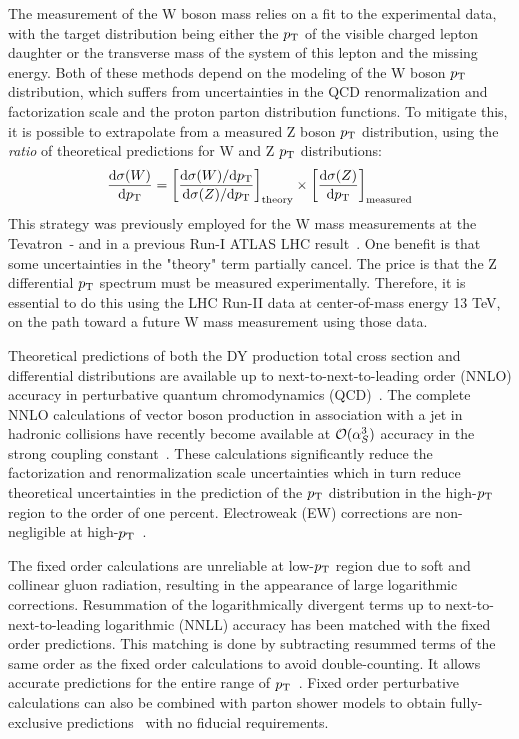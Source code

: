 The measurement of the W boson mass relies on a fit to the experimental data, with the
target distribution being either the $p_{\mathrm{T}}$ of the visible charged lepton daughter
or the transverse mass of the system of this lepton and the missing energy.
Both of these methods depend on the modeling of the W boson $p_{\mathrm{T}}$ distribution,
which suffers from uncertainties in the QCD renormalization and factorization scale and the proton parton distribution functions.
To mitigate this, it is possible to extrapolate from a measured Z boson $p_{\mathrm{T}}$ distribution, using
the \textit{ratio} of theoretical predictions for W and Z $p_{\mathrm{T}}$ distributions:
\begin{equation}
\frac{\mathrm{d}\sigma(W)}{\mathrm{d} p_{\mathrm{T}}} = \left[ \frac{\mathrm{d}\sigma(W)/\mathrm{d}p_{\mathrm{T}} }{\mathrm{d}\sigma(Z)/\mathrm{d} p_{\mathrm{T}} } \right]_\mathrm{theory} \times \left[ \frac{\mathrm{d}\sigma(Z)}{\mathrm{d} p_{\mathrm{T}}} \right]_\mathrm{measured}
\end{equation}
This strategy was previously employed for the W mass measurements at the Tevatron~\cite{Abazov:2012bv}-\cite{Aaltonen:2012bp} and in a previous Run-I ATLAS LHC result~\cite{Aaboud:2017svj}.
One benefit is that some uncertainties in the "theory" term partially cancel.
The price is that the Z differential $p_{\mathrm{T}}$ spectrum must be measured experimentally.
Therefore, it is essential to do this using the LHC Run-II data at center-of-mass energy 13 TeV,
on the path toward a future W mass measurement using those data.
      
Theoretical predictions of both the DY production total cross section and 
differential distributions are available up to next-to-next-to-leading order 
(NNLO) accuracy in perturbative quantum chromodynamics 
(QCD)~\cite{Melnikov:2006kv,Catani:2009sm}. The complete NNLO calculations of 
vector boson production in association with a jet in hadronic collisions have 
recently become available at $\mathcal{O}(\alpha_S^3)$ accuracy in the strong 
coupling constant~\cite{Ridder:2015dxa,Boughezal:2015ded,Boughezal:2015dva}. 
These calculations significantly reduce the factorization and renormalization scale 
uncertainties which in turn reduce theoretical uncertainties in the prediction 
of the $p_{\mathrm{T}}$ distribution in the high-$p_{\mathrm{T}}$ region to the order of one 
percent. Electroweak (EW) corrections are non-negligible at 
high-$p_{\mathrm{T}}$~\cite{Dittmaier:2014qza,Lindert:2017olm}.      

The fixed order calculations are unreliable at low-$p_{\mathrm{T}}$ region due to soft 
and collinear gluon radiation, resulting in the appearance of large logarithmic 
corrections.
Resummation of the logarithmically divergent terms up to next-to-next-to-leading logarithmic (NNLL) accuracy has been matched with the fixed order predictions.
This matching is done by subtracting resummed terms of the same order as the fixed order calculations to avoid double-counting.
It allows accurate predictions for the entire range of $p_{\mathrm{T}}$~\cite{Balazs:1995nz,Catani:2015vma}.
Fixed order perturbative calculations can also be combined with parton shower models to obtain 
fully-exclusive predictions~\cite{MCatNLO,Nason:2004rx,Frixione:2002ik,Alioli:2010xd} with
no fiducial requirements.      

